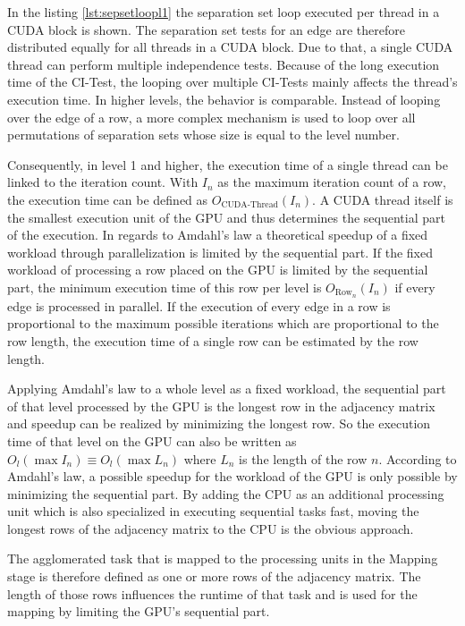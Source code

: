 In the listing \ref{lst:sepsetloopl1} the separation set loop executed per thread in a CUDA block is shown. The separation set tests for an edge are therefore distributed equally for all threads in a CUDA block. Due to that, a single CUDA thread can perform multiple independence tests. Because of the long execution time of the CI-Test, the looping over multiple CI-Tests mainly affects the thread's execution time. In higher levels, the behavior is comparable. Instead of looping over the edge of a row, a more complex mechanism is used to loop over all permutations of separation sets whose size is equal to the level number.

Consequently, in level 1 and higher, the execution time of a single thread can be linked to the iteration count. With $I_n$ as the maximum iteration count of a row, the execution time can be defined as $O_{\text{CUDA-Thread}}(I_n)$. A CUDA thread itself is the smallest execution unit of the GPU and thus determines the sequential part of the execution. In regards to Amdahl's law \cite{amdahlValiditySingleProcessor1967} a theoretical speedup of a fixed workload through parallelization is limited by the sequential part. If the fixed workload of processing a row placed on the GPU is limited by the sequential part, the minimum execution time of this row per level is $O_{\text{Row}_n}(I_n)$ if every edge is processed in parallel. If the execution of every edge in a row is proportional to the maximum possible iterations which are proportional to the row length, the execution time of a single row can be estimated by the row length.

Applying Amdahl's law to a whole level as a fixed workload, the sequential part of that level processed by the GPU is the longest row in the adjacency matrix and speedup can be realized by minimizing the longest row. So the execution time of that level on the GPU can also be written as $O_{l}(\max I_n) \equiv O_{l}(\max L_n)$ where $L_n$ is the length of the row $n$. According to Amdahl's law, a possible speedup for the workload of the GPU is only possible by minimizing the sequential part. By adding the CPU as an additional processing unit which is also specialized in executing sequential tasks fast, moving the longest rows of the adjacency matrix to the CPU is the obvious approach.

The agglomerated task that is mapped to the processing units in the Mapping stage is therefore defined as one or more rows of the adjacency matrix. The length of those rows influences the runtime of that task and is used for the mapping by limiting the GPU's sequential part.

